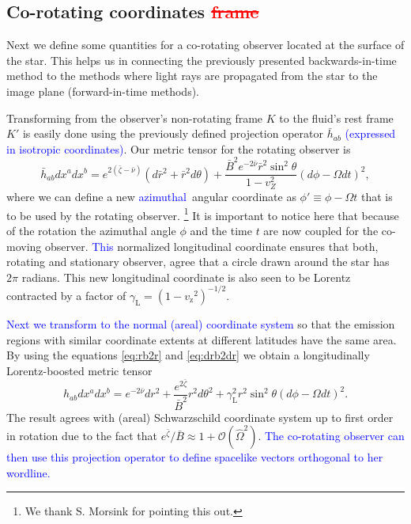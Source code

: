 \documentclass{aa}
\newcommand{\be}{\begin{equation}}
\newcommand{\ee}{\end{equation}}
\newcommand{\refe}[1]{\textcolor{blue}{{#1}}}
\newcommand{\refedel}[1]{\textcolor{red}{\sout{#1}}}
\newcommand{\sch}{Schwarzschild }
\newcommand{\rb}{\ensuremath{\bar{r}}}
\newcommand{\Ob}{\ensuremath{\hat{\Omega}}}
\newcommand{\nub}{\ensuremath{\bar{\nu}}}
\newcommand{\zetab}{\ensuremath{\bar{\zeta}}}
\newcommand{\Bb}{\ensuremath{\bar{B}}}
\newcommand{\vz}{\ensuremath{v_{\mathrm{z}}}}
\newcommand{\lgamma}{\gamma_{\text{L}}}
\begin{document}
\subsection{Co-rotating coordinates \refedel{frame}}\label{sect:coords}
Next we define some quantities for a co-rotating observer located at the surface of the star.
This helps us in connecting the previously presented backwards-in-time method to the methods where light rays are propagated from the star to the image plane (forward-in-time methods).

Transforming from the observer's non-rotating frame $K$ to the fluid's rest frame $K'$ is easily done using the previously defined projection operator $\bar{h}_{ab}$ \refe{(expressed in isotropic coordinates)}. 
Our metric tensor for the rotating observer is 
\be
\bar{h}_{ab} dx^a dx^b = e^{2(\zetab - \nub)} (d\rb^2 + \rb^2 d\theta) + \frac{\Bb^2 e^{-2\nub} \rb^2 \sin^2\theta}{1-v_Z^2} (d\phi - \Omega dt)^2,
\ee
where we can define a new \refe{azimuthal} angular coordinate as $\phi' \equiv \phi - \Omega t$ that is to be used by the rotating observer.%
\footnote{We thank S. Morsink for pointing this out.}
It is important to notice here that because of the rotation the azimuthal angle $\phi$ and the time $t$ are now coupled for the co-moving observer.
\refe{This} normalized longitudinal coordinate ensures that both, rotating and stationary observer, agree that a circle drawn around the star has $2\pi$ radians.
This new longitudinal coordinate is also seen to be Lorentz contracted by a factor of $\lgamma = (1-\vz^2)^{-1/2}$.

\refe{Next we transform to the normal (areal) coordinate system} so that the emission regions with similar coordinate extents at different latitudes have the same area.
By using the equations \eqref{eq:rb2r} and \eqref{eq:drb2dr} we obtain a longitudinally Lorentz-boosted metric tensor 
\be \label{eq:gammaSch} 
h_{ab} dx^a dx^b = e^{-2\nub}dr^2 + \frac{e^{2\zetab}}{\Bb^2} r^2 d\theta^2 + \lgamma^2 r^2 \sin^2\theta (d\phi - \Omega dt)^2.
\ee 
The result agrees with (areal) \sch coordinate system up to first order in rotation due to the fact that $e^{\zetab}/\Bb \approx 1 + \mathcal{O}(\Ob^2)$.  
\refe{The co-rotating observer can then use this projection operator to define spacelike vectors orthogonal to her wordline.}
\end{document}

